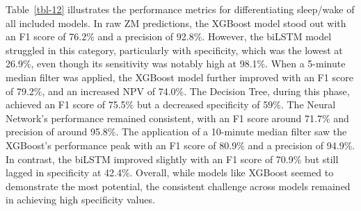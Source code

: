 \documentclass[
  10pt,
]{scrbook}
\begin{document}
\endgroup

Table~\ref{tbl-12} illustrates the performance metrics for
differentiating sleep/wake of all included models. In raw ZM
predictions, the XGBoost model stood out with an F1 score of 76.2\% and
a precision of 92.8\%. However, the biLSTM model struggled in this
category, particularly with specificity, which was the lowest at 26.9\%,
even though its sensitivity was notably high at 98.1\%. When a 5-minute
median filter was applied, the XGBoost model further improved with an F1
score of 79.2\%, and an increased NPV of 74.0\%. The Decision Tree,
during this phase, achieved an F1 score of 75.5\% but a decreased
specificity of 59\%. The Neural Network's performance remained
consistent, with an F1 score around 71.7\% and precision of around
95.8\%. The application of a 10-minute median filter saw the XGBoost's
performance peak with an F1 score of 80.9\% and a precision of 94.9\%.
In contrast, the biLSTM improved slightly with an F1 score of 70.9\% but
still lagged in specificity at 42.4\%. Overall, while models like
XGBoost seemed to demonstrate the most potential, the consistent
challenge across models remained in achieving high specificity values.

\begingroup

\footnotesize
\end{document}

